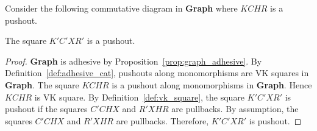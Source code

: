 \begin{lemma}
    \label{kpcpxrp_po}
    Consider the following commutative diagram in \textbf{Graph} where $KCHR$ is a pushout.
    \begin{center}
        \end{center} 
        The square $K'C'XR'$ is a pushout.
\end{lemma}
\begin{proof}
    \textbf{Graph} is adhesive by Proposition~\ref{prop:graph_adhesive}. By Definition~\ref{def:adhesive_cat}, pushouts along monomorphisms are VK squares in \textbf{Graph}. The square $KCHR$ is a pushout along monomorphisms in \textbf{Graph}. Hence $KCHR$ is VK square. By Definition~\ref{def:vk_square}, the square $K'C'XR'$ is pushout if the squares $C'CHX$ and $R'XHR$ are pullbacks. By assumption, the squares $C'CHX$ and $R'XHR$ are pullbacks. Therefore, $K'C'XR'$ is pushout.
\end{proof} 

